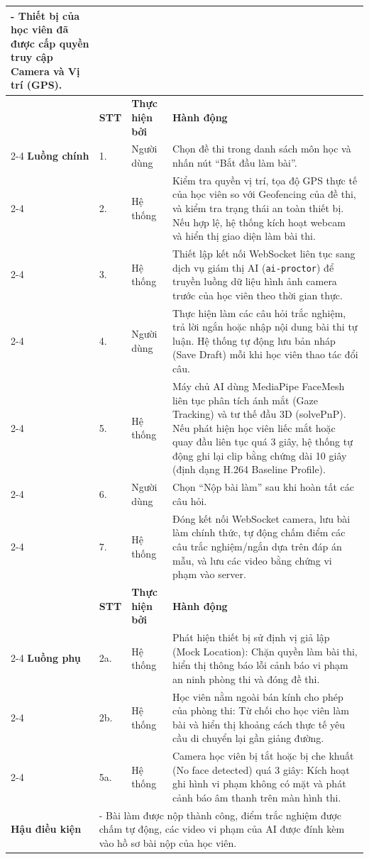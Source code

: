\documentclass[../DoAn.tex]{subfiles}
\begin{document}
\begin{longtable}{|p{2.8cm}|p{0.8cm}|p{2.2cm}|p{7.5cm}|}
{      - Thiết bị của học viên đã được cấp quyền truy cập Camera và Vị trí (GPS).} \\ \hline
     & \textbf{STT} & \textbf{Thực hiện bởi} & \textbf{Hành động} \\ \cline{2-4}
    \textbf{Luồng chính} & 1. & Người dùng & Chọn đề thi trong danh sách môn học và nhấn nút ``Bắt đầu làm bài''. \\ \cline{2-4}
     & 2. & Hệ thống & Kiểm tra quyền vị trí, tọa độ GPS thực tế của học viên so với Geofencing của đề thi, và kiểm tra trạng thái an toàn thiết bị. Nếu hợp lệ, hệ thống kích hoạt webcam và hiển thị giao diện làm bài thi. \\ \cline{2-4}
     & 3. & Hệ thống & Thiết lập kết nối WebSocket liên tục sang dịch vụ giám thị AI (\mbox{\texttt{ai-proctor}}) để truyền luồng dữ liệu hình ảnh camera trước của học viên theo thời gian thực. \\ \cline{2-4}
     & 4. & Người dùng & Thực hiện làm các câu hỏi trắc nghiệm, trả lời ngắn hoặc nhập nội dung bài thi tự luận. Hệ thống tự động lưu bản nháp (Save Draft) mỗi khi học viên thao tác đổi câu. \\ \cline{2-4}
     & 5. & Hệ thống & Máy chủ AI dùng MediaPipe FaceMesh liên tục phân tích ánh mắt (Gaze Tracking) và tư thế đầu 3D (solvePnP). Nếu phát hiện học viên liếc mắt hoặc quay đầu liên tục quá 3 giây, hệ thống tự động ghi lại clip bằng chứng dài 10 giây (định dạng H.264 Baseline Profile). \\ \cline{2-4}
     & 6. & Người dùng & Chọn ``Nộp bài làm'' sau khi hoàn tất các câu hỏi. \\ \cline{2-4}
     & 7. & Hệ thống & Đóng kết nối WebSocket camera, lưu bài làm chính thức, tự động chấm điểm các câu trắc nghiệm/ngắn dựa trên đáp án mẫu, và lưu các video bằng chứng vi phạm vào server. \\ \hline
     & \textbf{STT} & \textbf{Thực hiện bởi} & \textbf{Hành động} \\ \cline{2-4}
    \textbf{Luồng phụ} & 2a. & Hệ thống & Phát hiện thiết bị sử định vị giả lập (Mock Location): Chặn quyền làm bài thi, hiển thị thông báo lỗi cảnh báo vi phạm an ninh phòng thi và đóng đề thi. \\ \cline{2-4}
     & 2b. & Hệ thống & Học viên nằm ngoài bán kính cho phép của phòng thi: Từ chối cho học viên làm bài và hiển thị khoảng cách thực tế yêu cầu di chuyển lại gần giảng đường. \\ \cline{2-4}
     & 5a. & Hệ thống & Camera học viên bị tắt hoặc bị che khuất (No face detected) quá 3 giây: Kích hoạt ghi hình vi phạm không có mặt và phát cảnh báo âm thanh trên màn hình thi. \\ \hline
    \textbf{Hậu điều kiện} & \multicolumn{3}{p{10.9cm}|}{- Bài làm được nộp thành công, điểm trắc nghiệm được chấm tự động, các video vi phạm của AI được đính kèm vào hồ sơ bài nộp của học viên.} \\ \hline
\end{longtable}
\end{document}
